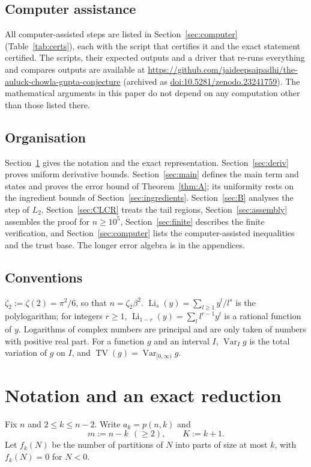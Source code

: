 \documentclass[11pt]{amsart}
\newcommand{\repo}{\url{https://github.com/jaideepsaipadhi/the-auluck-chowla-gupta-conjecture} (archived as \href{https://doi.org/10.5281/zenodo.23241759}{doi:10.5281/zenodo.23241759})}
\theoremstyle{definition}
\theoremstyle{remark}
\numberwithin{equation}{section}
\newcommand{\Li}{\operatorname{Li}}
\newcommand{\TV}{\operatorname{TV}}
\newcommand{\Var}{\operatorname{Var}}
\begin{document}
\subsection*{Computer assistance}
All computer-assisted steps are listed in Section~\ref{sec:computer} (Table~\ref{tab:certs}), each with the script that
certifies it and the exact statement certified. The scripts, their expected outputs and a driver that re-runs everything and
compares outputs are available at \repo. The mathematical arguments in this paper do not depend on any computation other than
those listed there.

\subsection*{Organisation}
Section~\ref{sec:rep} gives the notation and the exact representation. Section~\ref{sec:deriv} proves uniform derivative bounds.
Section~\ref{sec:main} defines the main term and states and proves the error bound of Theorem~\ref{thm:A}; its uniformity rests on
the ingredient bounds of Section~\ref{sec:ingredients}. Section~\ref{sec:B} analyses the step of $L_2$. Section~\ref{sec:CLCR}
treats the tail regions, Section~\ref{sec:assembly} assembles the proof for $n\ge10^5$, Section~\ref{sec:finite} describes the
finite verification, and Section~\ref{sec:computer} lists the computer-assisted inequalities and the trust base. The longer
error algebra is in the appendices.

\subsection*{Conventions}
$\zeta_2:=\zeta(2)=\pi^2/6$, so that $n=\zeta_2\beta^2$. $\Li_s(y)=\sum_{l\ge1}y^l/l^s$ is the polylogarithm; for integers
$r\ge1$, $\Li_{1-r}(y)=\sum_l l^{r-1}y^l$ is a rational function of $y$. Logarithms of complex numbers are principal and are only
taken of numbers with positive real part. For a function $g$ and an interval $I$, $\Var_I g$ is the total variation of $g$ on $I$,
and $\TV(g)=\Var_{[0,\infty)}g$.

\section{Notation and an exact reduction}\label{sec:rep}

Fix $n$ and $2\le k\le n-2$. Write $a_k=p(n,k)$ and
\[
  m:=n-k\ \ (\ge2),\qquad K:=k+1 .
\]
Let $f_k(N)$ be the number of partitions of $N$ into parts of size at most $k$, with $f_k(N)=0$ for $N<0$.
\end{document}
